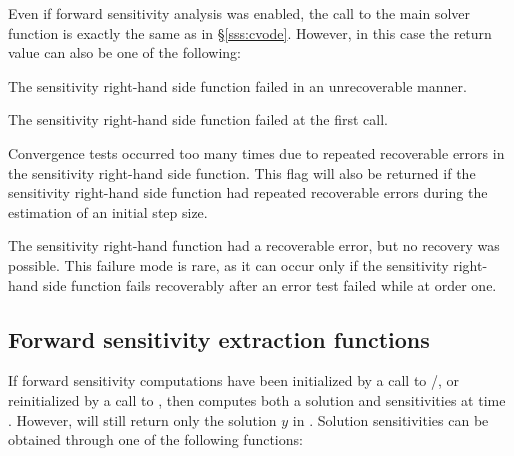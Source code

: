 Even if forward sensitivity analysis was enabled, the call to the main solver 
function  is exactly the same as in \S\ref{sss:cvode}. However, in this
case the return value  can also be one of the following:
\begin{args}
\item[\Id{CV\_SRHSFUNC\_FAIL}]
  The sensitivity right-hand side function failed in an unrecoverable manner.
\item[\Id{CV\_FIRST\_SRHSFUNC\_ERR}]
  The sensitivity right-hand side function failed at the first call.
\item[\Id{CV\_REPTD\_SRHSFUNC\_ERR}]
  Convergence tests occurred too many times due to repeated recoverable errors in
  the sensitivity right-hand side function. This flag will also
  be returned if the sensitivity right-hand side function had repeated recoverable errors
  during the estimation of an initial step size.
\item[\Id{CV\_UNREC\_SRHSFUNC\_ERR}]
  The sensitivity right-hand function had a recoverable error, but no recovery was possible.
  This failure mode is rare, as it can occur only if the sensitivity right-hand side function
  fails recoverably after an error test failed while at order one.
\end{args}


\subsection{Forward sensitivity extraction functions}\label{ss:sensi_get}

If forward sensitivity computations have been initialized by a call to
/, or reinitialized by a call to ,
then {\cvodes} computes both a solution and sensitivities at time
. However,  will still return only the solution $y$ in
.  Solution sensitivities can be obtained through one of the
following functions:

